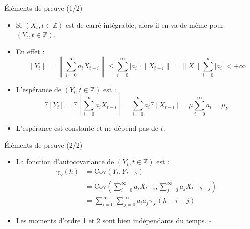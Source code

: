 \documentclass[11pt,aspectratio=169]{beamer}
\newcommand{\E}{\mathbb{E}}
\newcommand{\Cov}{\mathrm{Cov}}
\newcommand{\Z}{\mathbb{Z}}
\begin{document}
\begin{frame}{Éléments de preuve (1/2)}

\begin{itemize}

\item Si $(X_t, t \in \Z)$ est de carré intégrable, alors il en va de même pour $(Y_t, t \in \Z)$.\newline

\item En effet :
  \[
  \|Y_t\| = \left\|\sum_{i=0}^{\infty} a_i X_{t-i}\right\| \leq \sum_{i=0}^{\infty} |a_i| \cdot \|X_{t-i}\| = \|X\| \sum_{i=0}^{\infty} |a_i| < +\infty
  \]\newline

\item L'espérance de $(Y_t, t \in \Z)$ est :
  \[
  \E[Y_t] = \E\left[\sum_{i=0}^{\infty} a_i X_{t-i}\right] = \sum_{i=0}^{\infty} a_i \E[X_{t-i}] = \mu \sum_{i=0}^{\infty} a_i = \mu_Y
  \]\newline

\item L'espérance est constante et ne dépend pas de $t$.

\end{itemize}

\end{frame}

\begin{frame}{Éléments de preuve (2/2)}

\begin{itemize}

\item La fonction d'autocovariance de $(Y_t, t \in \Z)$ est :
  \begin{align*}
  \gamma_Y(h) &= \Cov(Y_t, Y_{t-h}) \\
  &= \Cov\left(\sum_{i=0}^{\infty} a_i X_{t-i}, \sum_{j=0}^{\infty} a_j X_{t-h-j}\right) \\
  &= \sum_{i=0}^{\infty} \sum_{j=0}^{\infty} a_i a_j \gamma_X(h+i-j)
  \end{align*}\newline

\item Les moments d'ordre 1 et 2 sont bien indépendants du temps. \hfill $\square$

\end{itemize}

\end{frame}

\end{document}
